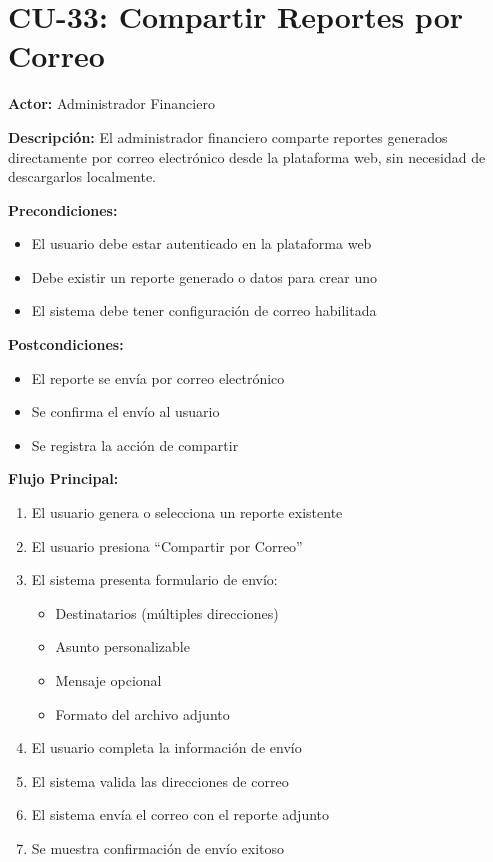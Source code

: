 \section{CU-33: Compartir Reportes por Correo}

\noindent\textbf{Actor:} Administrador Financiero

\noindent\textbf{Descripción:} El administrador financiero comparte reportes generados directamente por correo electrónico desde la plataforma web, sin necesidad de descargarlos localmente.

\noindent\textbf{Precondiciones:}
\begin{itemize}
    \item El usuario debe estar autenticado en la plataforma web
    \item Debe existir un reporte generado o datos para crear uno
    \item El sistema debe tener configuración de correo habilitada
\end{itemize}

\noindent\textbf{Postcondiciones:}
\begin{itemize}
    \item El reporte se envía por correo electrónico
    \item Se confirma el envío al usuario
    \item Se registra la acción de compartir
\end{itemize}

\noindent\textbf{Flujo Principal:}
\begin{enumerate}
    \item El usuario genera o selecciona un reporte existente
    \item El usuario presiona ``Compartir por Correo''
    \item El sistema presenta formulario de envío:
    \begin{itemize}
        \item Destinatarios (múltiples direcciones)
        \item Asunto personalizable
        \item Mensaje opcional
        \item Formato del archivo adjunto
    \end{itemize}
    \item El usuario completa la información de envío
    \item El sistema valida las direcciones de correo
    \item El sistema envía el correo con el reporte adjunto
    \item Se muestra confirmación de envío exitoso
\end{enumerate}

